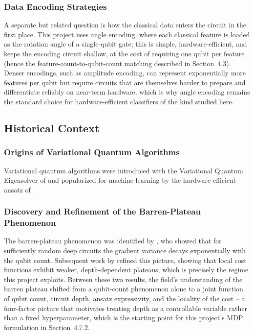 \subsubsection{Data Encoding Strategies}
A separate but related question is how the classical data enters the circuit in the first place. This project uses angle encoding, where each classical feature is loaded as the rotation angle of a single-qubit gate; this is simple, hardware-efficient, and keeps the encoding circuit shallow, at the cost of requiring one qubit per feature (hence the feature-count-to-qubit-count matching described in Section~4.3). Denser encodings, such as amplitude encoding, can represent exponentially more features per qubit but require circuits that are themselves harder to prepare and differentiate reliably on near-term hardware, which is why angle encoding remains the standard choice for hardware-efficient classifiers of the kind studied here.

\subsection{Historical Context}

\subsubsection{Origins of Variational Quantum Algorithms}
Variational quantum algorithms were introduced with the Variational Quantum Eigensolver of \citet{peruzzo2014variational} and popularized for machine learning by the hardware-efficient ansatz of \citet{kandala2017hardware}.

\subsubsection{Discovery and Refinement of the Barren-Plateau Phenomenon}
The barren-plateau phenomenon was identified by \citet{mcclean2018barren}, who showed that for sufficiently random deep circuits the gradient variance decays exponentially with the qubit count. Subsequent work by \citet{cerezo2021cost} refined this picture, showing that local cost functions exhibit weaker, depth-dependent plateaus, which is precisely the regime this project exploits. Between these two results, the field's understanding of the barren plateau shifted from a qubit-count phenomenon alone to a joint function of qubit count, circuit depth, ansatz expressivity, and the locality of the cost -- a four-factor picture that motivates treating depth as a controllable variable rather than a fixed hyperparameter, which is the starting point for this project's MDP formulation in Section~4.7.2.

